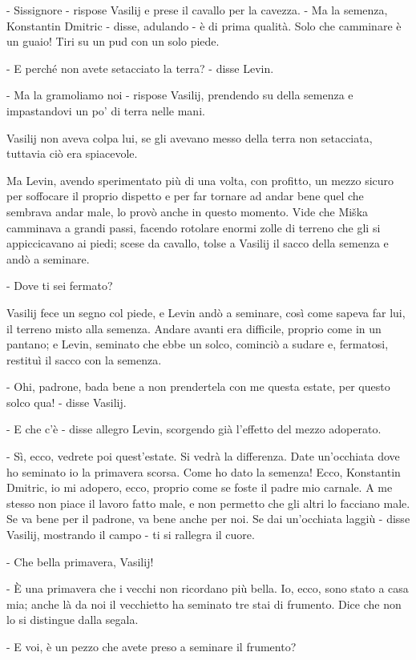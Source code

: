 - Sissignore - rispose Vasilij e prese il cavallo per la cavezza. - Ma la semenza, Konstantin Dmitric - disse, adulando - è di prima qualità. Solo che camminare è un guaio! Tiri su un pud con un solo piede. 

- E perché non avete setacciato la terra? - disse Levin. 

- Ma la gramoliamo noi - rispose Vasilij, prendendo su della semenza e impastandovi un po' di terra nelle mani. 

Vasilij non aveva colpa lui, se gli avevano messo della terra non setacciata, tuttavia ciò era spiacevole. 

Ma Levin, avendo sperimentato più di una volta, con profitto, un mezzo sicuro per soffocare il proprio dispetto e per far tornare ad andar bene quel che sembrava andar male, lo provò anche in questo momento. Vide che Miška camminava a grandi passi, facendo rotolare enormi zolle di terreno che gli si appiccicavano ai piedi; scese da cavallo, tolse a Vasilij il sacco della semenza e andò a seminare. 

- Dove ti sei fermato? 

Vasilij fece un segno col piede, e Levin andò a seminare, così come sapeva far lui, il terreno misto alla semenza. Andare avanti era difficile, proprio come in un pantano; e Levin, seminato che ebbe un solco, cominciò a sudare e, fermatosi, restituì il sacco con la semenza. 

- Ohi, padrone, bada bene a non prendertela con me questa estate, per questo solco qua! - disse Vasilij. 

- E che c'è - disse allegro Levin, scorgendo già l'effetto del mezzo adoperato. 

- Sì, ecco, vedrete poi quest'estate. Si vedrà la differenza. Date un'occhiata dove ho seminato io la primavera scorsa. Come ho dato la semenza! Ecco, Konstantin Dmitric, io mi adopero, ecco, proprio come se foste il padre mio carnale. A me stesso non piace il lavoro fatto male, e non permetto che gli altri lo facciano male. Se va bene per il padrone, va bene anche per noi. Se dai un'occhiata laggiù - disse Vasilij, mostrando il campo - ti si rallegra il cuore. 

- Che bella primavera, Vasilij! 

- È una primavera che i vecchi non ricordano più bella. Io, ecco, sono stato a casa mia; anche là da noi il vecchietto ha seminato tre stai di frumento. Dice che non lo si distingue dalla segala. 

- E voi, è un pezzo che avete preso a seminare il frumento? 

